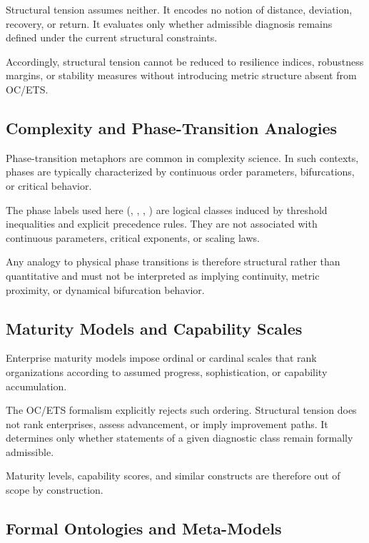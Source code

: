 Structural tension assumes neither. It encodes no notion of distance,
deviation, recovery, or return. It evaluates only whether admissible
diagnosis remains defined under the current structural constraints.

Accordingly, structural tension cannot be reduced to resilience indices,
robustness margins, or stability measures without introducing metric
structure absent from OC/ETS.

\subsection{Complexity and Phase-Transition Analogies}

Phase-transition metaphors are common in complexity science. In such
contexts, phases are typically characterized by continuous order
parameters, bifurcations, or critical behavior.

The phase labels used here (\PHASESUCCESS, \PHASEINERTIA,
\PHASECOLLAPSE, \PHASESTOP) are logical classes induced by threshold
inequalities and explicit precedence rules. They are not associated with
continuous parameters, critical exponents, or scaling laws.

Any analogy to physical phase transitions is therefore structural rather
than quantitative and must not be interpreted as implying continuity,
metric proximity, or dynamical bifurcation behavior.

\subsection{Maturity Models and Capability Scales}

Enterprise maturity models impose ordinal or cardinal scales that rank
organizations according to assumed progress, sophistication, or
capability accumulation.

The OC/ETS formalism explicitly rejects such ordering. Structural tension
does not rank enterprises, assess advancement, or imply improvement
paths. It determines only whether statements of a given diagnostic class
remain formally admissible.

Maturity levels, capability scores, and similar constructs are therefore
out of scope by construction.

\subsection{Formal Ontologies and Meta-Models}

